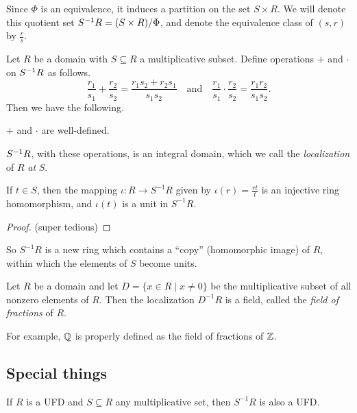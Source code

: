 Since \(\Phi\) is an equivalence, it induces a partition on the set \(S \times R\). We will denote this quotient set \(\LOCALIZE{R}{S} = (S \times R)/\Phi\), and denote the equivalence class of \((s,r)\) by \(\frac{r}{s}\).

\begin{prop}
Let \(R\) be a domain with \(S \subseteq R\) a multiplicative subset. Define operations \(+\) and \(\cdot\) on \(\LOCALIZE{R}{S}\) as follows. \[ \frac{r_1}{s_1} + \frac{r_2}{s_2} = \frac{r_1s_2 + r_2s_1}{s_1s_2} \quad \mathrm{and} \quad \frac{r_1}{s_1} \cdot \frac{r_2}{s_2} = \frac{r_1r_2}{s_1s_2}. \] Then we have the following.
\begin{proplist}
\item \(+\) and \(\cdot\) are well-defined.
\item \(\LOCALIZE{R}{S}\), with these operations, is an integral domain, which we call the \emph{localization} of \(R\) \emph{at} \(S\).
\item If \(t \in S\), then the mapping \(\iota : R \rightarrow S^{-1}R\) given by \(\iota(r) = \frac{rt}{t}\) is an injective ring homomorphism, and \(\iota(t)\) is a unit in \(S^{-1}R\).
\end{proplist}
\end{prop}

\begin{proof}
(super tedious)
\end{proof}

So \(S^{-1}R\) is a new ring which contains a ``copy'' (homomorphic image) of \(R\), within which the elements of \(S\) become units.

\begin{dfn}
Let \(R\) be a domain and let \(D = \{ x \in R \mid x \neq 0 \}\) be the multiplicative subset of all nonzero elements of \(R\). Then the localization \(D^{-1}R\) is a field, called the \emph{field of fractions} of \(R\).
\end{dfn}

For example, \(\QQ\) is properly defined as the field of fractions of \(\ZZ\).

\subsection*{Special things}

\begin{prop}
If \(R\) is a UFD and \(S \subseteq R\) any multiplicative set, then \(S^{-1}R\) is also a UFD.
\end{prop}

